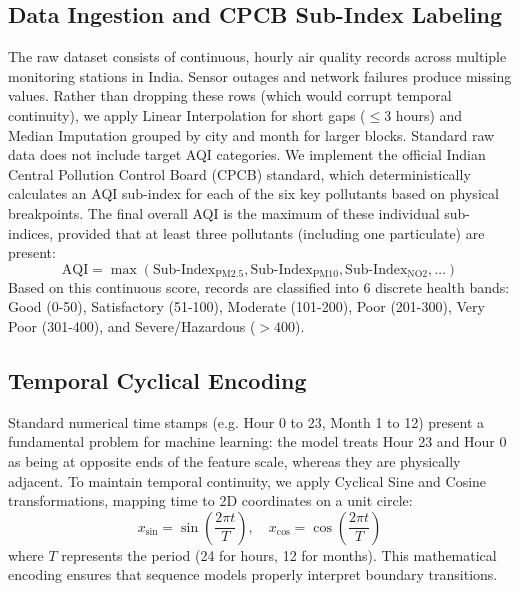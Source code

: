 \documentclass[conference]{IEEEtran}
\begin{document}
\subsection{Data Ingestion and CPCB Sub-Index Labeling}
The raw dataset consists of continuous, hourly air quality records across multiple monitoring stations in India. Sensor outages and network failures produce missing values. Rather than dropping these rows (which would corrupt temporal continuity), we apply Linear Interpolation for short gaps ($\le 3$ hours) and Median Imputation grouped by city and month for larger blocks. Standard raw data does not include target AQI categories. We implement the official Indian Central Pollution Control Board (CPCB) standard, which deterministically calculates an AQI sub-index for each of the six key pollutants based on physical breakpoints. The final overall AQI is the maximum of these individual sub-indices, provided that at least three pollutants (including one particulate) are present:
\begin{equation}
\text{AQI} = \max(\text{Sub-Index}_{\text{PM2.5}}, \text{Sub-Index}_{\text{PM10}}, \text{Sub-Index}_{\text{NO2}}, \dots)
\end{equation}
Based on this continuous score, records are classified into 6 discrete health bands: Good (0-50), Satisfactory (51-100), Moderate (101-200), Poor (201-300), Very Poor (301-400), and Severe/Hazardous ($>400$).

\subsection{Temporal Cyclical Encoding}
Standard numerical time stamps (e.g. Hour 0 to 23, Month 1 to 12) present a fundamental problem for machine learning: the model treats Hour 23 and Hour 0 as being at opposite ends of the feature scale, whereas they are physically adjacent. To maintain temporal continuity, we apply Cyclical Sine and Cosine transformations, mapping time to 2D coordinates on a unit circle:
\begin{equation}
x_{\sin} = \sin\left(\frac{2\pi t}{T}\right), \quad x_{\cos} = \cos\left(\frac{2\pi t}{T}\right)
\end{equation}
where $T$ represents the period (24 for hours, 12 for months). This mathematical encoding ensures that sequence models properly interpret boundary transitions.
\end{document}
